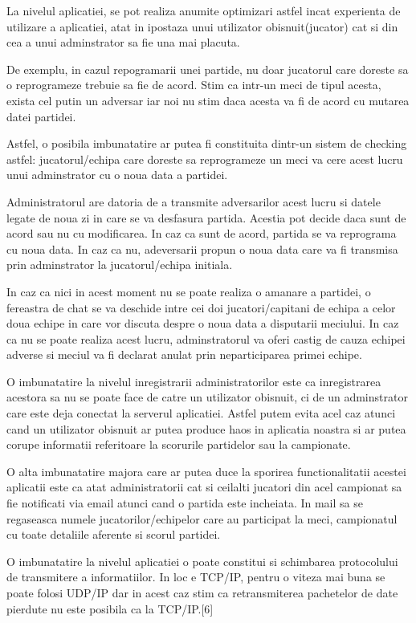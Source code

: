 \documentclass{article}
\begin{document}
\quad La nivelul aplicatiei, se pot realiza anumite optimizari astfel incat experienta de utilizare a aplicatiei, atat in ipostaza unui utilizator obisnuit(jucator) cat si din cea a unui adminstrator sa fie una mai placuta. 

De exemplu, in cazul repogramarii unei partide, nu doar jucatorul care doreste sa o reprogrameze trebuie sa fie de acord. Stim ca intr-un meci de tipul acesta, exista cel putin un adversar iar noi nu stim daca acesta va fi de acord cu mutarea datei partidei. 

Astfel, o posibila imbunatatire ar putea fi constituita dintr-un sistem de checking astfel: jucatorul/echipa care doreste sa reprogrameze un meci va cere acest lucru unui adminstrator cu o noua data a partidei. 

Administratorul are datoria de a transmite adversarilor acest lucru si datele legate de noua zi in care se va desfasura partida. Acestia pot decide daca sunt de acord sau nu cu modificarea. In caz ca sunt de acord, partida se va reprograma cu noua data. 
In caz ca nu, adeversarii propun o noua data care va fi transmisa prin adminstrator la jucatorul/echipa initiala. 

In caz ca nici in acest moment nu se poate realiza o amanare a partidei, o fereastra de chat se va deschide intre cei doi jucatori/capitani de echipa a celor doua echipe in care vor discuta despre o noua data a disputarii meciului. In caz ca nu se poate realiza acest lucru, adminstratorul va oferi castig de cauza echipei adverse si meciul va fi declarat anulat prin neparticiparea primei echipe.

O imbunatatire la nivelul inregistrarii administratorilor este ca inregistrarea acestora sa nu se poate face de catre un utilizator obisnuit, ci de un adminstrator care este deja conectat la serverul aplicatiei. Astfel putem evita acel caz atunci cand un utilizator obisnuit ar putea produce haos in aplicatia noastra si ar putea corupe informatii referitoare la scorurile partidelor sau la campionate. 

O alta imbunatatire majora care ar putea duce la sporirea functionalitatii acestei aplicatii este ca atat administratorii cat si ceilalti jucatori din acel campionat sa fie notificati via email atunci cand o partida este incheiata. In mail sa se regaseasca numele jucatorilor/echipelor care au participat la meci, campionatul cu toate detaliile aferente si scorul partidei.

O imbunatatire la nivelul aplicatiei o poate constitui si schimbarea protocolului de transmitere a informatiilor. In loc e TCP/IP, pentru o viteza mai buna se poate folosi UDP/IP dar in acest caz stim ca  retransmiterea pachetelor de date pierdute nu este posibila ca la TCP/IP.[6]
\end{document}
